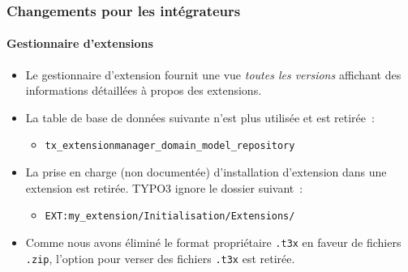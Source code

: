 %

\begin{frame}[fragile]
	\frametitle{Changements pour les intégrateurs}
	\framesubtitle{Gestionnaire d'extensions}

	\begin{itemize}

		\item Le gestionnaire d'extension fournit une vue \textit{toutes les versions}
			affichant des informations détaillées à propos des extensions.

		\item La table de base de données suivante n'est plus utilisée et est retirée~:
			\begin{itemize}\small
				\item \texttt{tx\_extensionmanager\_domain\_model\_repository}
			\end{itemize}\normalsize
			\vspace{0.2cm}

		\item La prise en charge (non documentée) d'installation d'extension dans une extension
			est retirée. TYPO3 ignore le dossier suivant~:
			\begin{itemize}\small
				\item \texttt{EXT:my\_extension/Initialisation/Extensions/}
			\end{itemize}
			\vspace{0.2cm}

		\item Comme nous avons éliminé le format propriétaire \texttt{.t3x} en faveur
			de fichiers \texttt{.zip}, l'option pour verser des fichiers \texttt{.t3x}
			est retirée.

	\end{itemize}

\end{frame}

